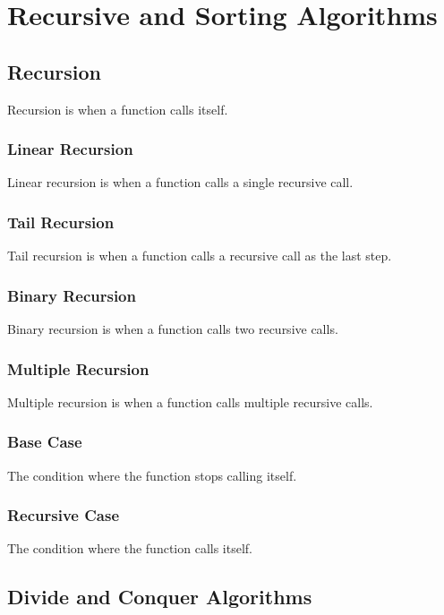 \chapter{Recursive and Sorting Algorithms}

\section{Recursion}

Recursion is when a function calls itself.

\subsection{Linear Recursion}

Linear recursion is when a function calls a single recursive call.

\subsection{Tail Recursion}

Tail recursion is when a function calls a recursive call as the last step.

\subsection{Binary Recursion}

Binary recursion is when a function calls two recursive calls.

\subsection{Multiple Recursion}

Multiple recursion is when a function calls multiple recursive calls.

\subsection{Base Case}

The condition where the function stops calling itself.

\subsection{Recursive Case}

The condition where the function calls itself.

\section{Divide and Conquer Algorithms}

